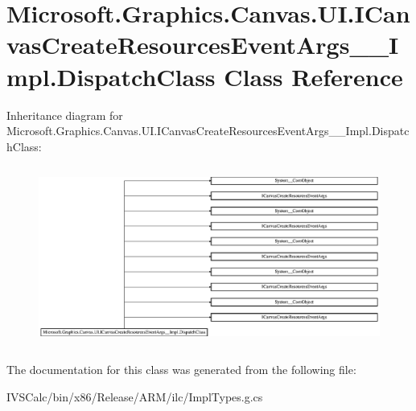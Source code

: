 \hypertarget{class_microsoft_1_1_graphics_1_1_canvas_1_1_u_i_1_1_i_canvas_create_resources_event_args_____impl_1_1_dispatch_class}{}\section{Microsoft.\+Graphics.\+Canvas.\+U\+I.\+I\+Canvas\+Create\+Resources\+Event\+Args\+\_\+\+\_\+\+Impl.\+Dispatch\+Class Class Reference}
\label{class_microsoft_1_1_graphics_1_1_canvas_1_1_u_i_1_1_i_canvas_create_resources_event_args_____impl_1_1_dispatch_class}
Inheritance diagram for Microsoft.\+Graphics.\+Canvas.\+U\+I.\+I\+Canvas\+Create\+Resources\+Event\+Args\+\_\+\+\_\+\+Impl.\+Dispatch\+Class\+:\begin{figure}[H]
\begin{center}
\leavevmode
\includegraphics[height=5.957447cm]{class_microsoft_1_1_graphics_1_1_canvas_1_1_u_i_1_1_i_canvas_create_resources_event_args_____impl_1_1_dispatch_class}
\end{center}
\end{figure}


The documentation for this class was generated from the following file\+:\begin{DoxyCompactItemize}
\item 
I\+V\+S\+Calc/bin/x86/\+Release/\+A\+R\+M/ilc/Impl\+Types.\+g.\+cs\end{DoxyCompactItemize}
